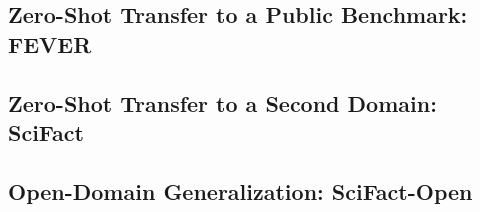 \subsection{Zero-Shot Transfer to a Public Benchmark: FEVER}
\label{sec:fever}


\subsection{Zero-Shot Transfer to a Second Domain: SciFact}
\label{sec:scifact}


\subsection{Open-Domain Generalization: SciFact-Open}
\label{sec:scifact-open}

